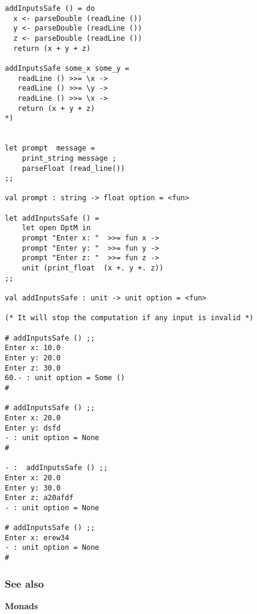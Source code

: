 \documentclass[11pt]{article}
\begin{document}
\begin{enumerate}
\begin{verbatim}
addInputsSafe () = do
  x <- parseDouble (readLine ())
  y <- parseDouble (readLine ())
  z <- parseDouble (readLine ())
  return (x + y + z)

addInputsSafe some_x some_y = 
   readLine () >>= \x ->
   readLine () >>= \y ->
   readLine () >>= \x -> 
   return (x + y + z)
*)


let prompt  message = 
    print_string message ;
    parseFloat (read_line())
;;

val prompt : string -> float option = <fun>

let addInputsSafe () = 
    let open OptM in 
    prompt "Enter x: "  >>= fun x ->
    prompt "Enter y: "  >>= fun y ->
    prompt "Enter z: "  >>= fun z ->
    unit (print_float  (x +. y +. z))
;;

val addInputsSafe : unit -> unit option = <fun>

(* It will stop the computation if any input is invalid *)

# addInputsSafe () ;;
Enter x: 10.0
Enter y: 20.0
Enter z: 30.0
60.- : unit option = Some ()
# 

# addInputsSafe () ;;
Enter x: 20.0
Enter y: dsfd
- : unit option = None
# 

- :  addInputsSafe () ;;
Enter x: 20.0
Enter y: 30.0
Enter z: a20afdf
- : unit option = None

# addInputsSafe () ;;
Enter x: erew34
- : unit option = None
#
\end{verbatim}
\end{enumerate}

\subsubsection{See also}
\label{sec-1-13-4}

\textbf{Monads}
\end{document}
